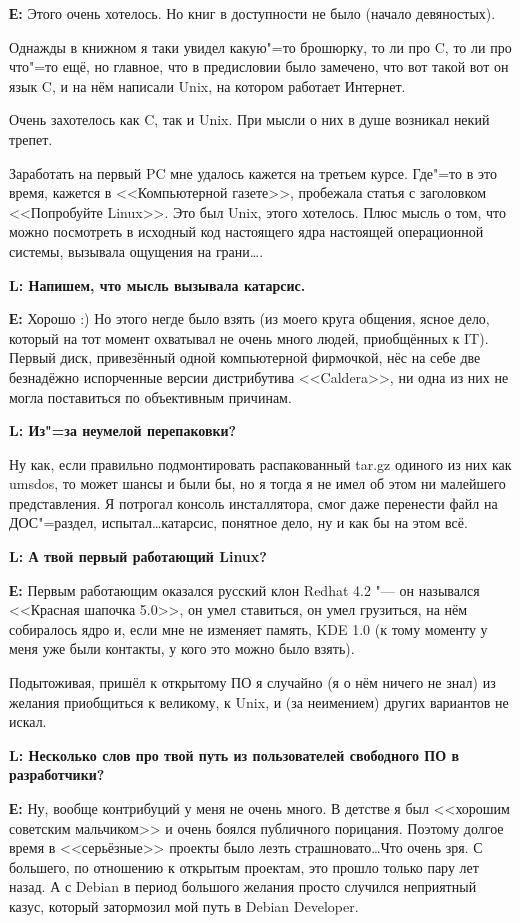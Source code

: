 \documentclass[10pt, a5paper]{article}
\begin{document}
{\noindent \bf Е:} Этого очень хотелось. Но книг в доступности не было (начало девяностых).

Однажды в книжном я таки увидел какую"=то брошюрку, то ли про C, то ли про что"=то ещё, но главное, что в предисловии было замечено, что вот такой вот он язык C, и на нём написали Unix, на котором работает Интернет.

Очень захотелось как C, так и Unix. При мысли о них в душе возникал некий трепет.

Заработать на первый PC мне удалось кажется на третьем курсе. Где"=то в это
время, кажется в <<Компьютерной газете>>, пробежала статья с заголовком <<Попробуйте Linux>>. Это был Unix, этого хотелось. Плюс мысль о том, что
можно посмотреть в исходный код настоящего ядра настоящей операционной
системы, вызывала ощущения на грани\ldots.

{\noindent \bf L: Напишем, что мысль вызывала катарсис.}

{\noindent \bf Е:} Хорошо :) Но этого негде было взять (из моего круга общения, ясное дело, который на
тот момент охватывал не очень много людей, приобщённых к IT). Первый диск, привезённый одной компьютерной фирмочкой, нёс на себе две безнадёжно испорченные версии дистрибутива <<Caldera>>, ни одна из них не могла поставиться
по объективным причинам.

{\noindent \bf L: Из"=за неумелой перепаковки?}

Ну как, если правильно подмонтировать распакованный tar.gz
одиного из них как umsdos, то может шансы и были бы, но я тогда я не имел
об этом ни малейшего представления. Я потрогал консоль инсталлятора,
смог даже перенести файл на ДОС"=раздел, испытал\ldots катарсис, понятное
дело, ну и как бы на этом всё.

{\noindent \bf L: А твой первый работающий Linux?}

{\noindent \bf Е:} Первым работающим оказался русский клон Redhat 4.2 "--- он назывался <<Красная шапочка
5.0>>, он умел ставиться, он умел грузиться, на нём собиралось ядро и, если
мне не изменяет память, KDE 1.0 (к тому моменту у меня уже были контакты,
у кого это можно было взять).

Подытоживая, пришёл к открытому ПО я случайно (я о нём ничего не знал) из
желания приобщиться к великому, к Unix, и (за неимением)  других вариантов не искал.

{\noindent \bf L: Несколько слов про твой путь из пользователей свободного ПО в разработчики?}

{\noindent \bf Е:} Ну, вообще контрибуций у меня не очень много. В детстве я был <<хорошим
советским мальчиком>> и очень боялся публичного порицания. Поэтому долгое
время в <<серьёзные>> проекты было лезть страшновато\ldots Что очень зря. С
большего, по отношению к открытым проектам, это прошло только пару лет
назад. А с Debian в период большого желания просто случился неприятный
казус, который затормозил мой путь в Debian Developer.
\end{document}

